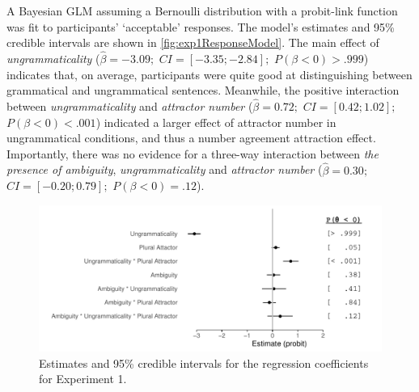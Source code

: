 \documentclass[doc,a4paper,man,natbib,floatsintext,noextraspace]{apa6}\usepackage[]{graphicx}\usepackage[]{color}
\makeatletter
\def\maxwidth{ %
  \ifdim\Gin@nat@width>\linewidth
    \linewidth
  \else
    \Gin@nat@width
  \fi
}
\newenvironment{knitrout}{}{} %
\makeatother
\begin{document}
A Bayesian GLM assuming a Bernoulli distribution with a probit-link function was fit to participants' `acceptable' responses. The model's estimates and 95\% credible intervals are shown in \autoref{fig:exp1ResponseModel}. 
%
%
The main effect of \textit{ungrammaticality} ($\hat{\beta}=-3.09;$ $CI=[-3.35; -2.84];$ $P(\beta<0)> .999$) indicates that, on average, participants were quite good at distinguishing between grammatical and ungrammatical sentences. Meanwhile, the positive interaction between \textit{ungrammaticality} and \textit{attractor number} ($\hat{\beta}=0.72;$ $CI=[0.42; 1.02];$ $P(\beta<0)< .001$) indicated a larger effect of attractor number in ungrammatical conditions, and thus a number agreement attraction effect.
Importantly, there was no evidence for a three-way interaction between \textit{the presence of ambiguity}, \textit{ungrammaticality} and \textit{attractor number} ($\hat{\beta}=0.30;$ $CI=[-0.20; 0.79];$ $P(\beta<0)=    .12$).




\begin{knitrout}
\color{fgcolor}\begin{figure}

{\centering \includegraphics[width=\maxwidth]{figure/exp1ResponseModel-1} 

}

\caption[Estimates and 95\% credible intervals for the regression coefficients for Experiment 1]{Estimates and 95\% credible intervals for the regression coefficients for Experiment 1.}\label{fig:exp1ResponseModel}
\end{figure}


\end{knitrout}
\end{document}
